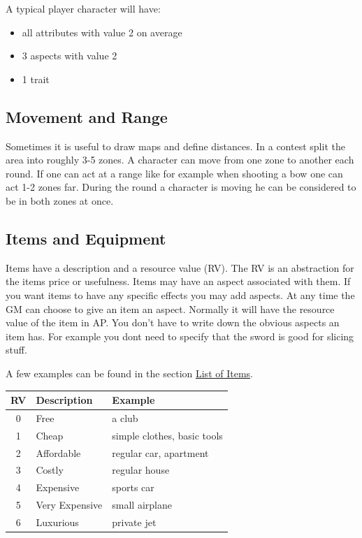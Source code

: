 \documentclass[11pt]{article}
\begin{document}
{A typical player character will have:
\begin{itemize}
\item all attributes with value 2 on average
\item 3 aspects with value 2
\item 1 trait
\end{itemize}

\subsection{Movement and Range}
\label{sec:orgcfd2a33}
Sometimes it is useful to draw maps and define distances. In a contest split the area into roughly 3-5 zones. A character can move from one zone to another each round. If one can act at a range like for example when shooting a bow one can act 1-2 zones far. During the round a character is moving he can be considered to be in both zones at once.

\subsection{Items and Equipment}
\label{sec:org115c7a1}
Items have a description and a resource value (RV). The RV is an abstraction for the items price or usefulness. 
Items may have an aspect associated with them. If you want items to have any specific effects you may add aspects. At any time the GM can choose to give an item an aspect. Normally it will have the resource value of the item in AP. You don't have to write down the obvious aspects an item has. For example you dont need to specify that the sword is good for slicing stuff.

A few examples can be found in the section \hyperref[sec:orge59c6d9]{List of Items}.

\begin{center}
\begin{tabular}{c|l|l}
\textbf{RV} & \textbf{Description} & \textbf{Example}\\[0pt]
\hline
0 & Free & a club\\[0pt]
1 & Cheap & simple clothes, basic tools\\[0pt]
2 & Affordable & regular car, apartment\\[0pt]
3 & Costly & regular house\\[0pt]
4 & Expensive & sports car\\[0pt]
5 & Very Expensive & small airplane\\[0pt]
6 & Luxurious & private jet\\[0pt]
\end{tabular}
\end{center}

}
\end{document}
